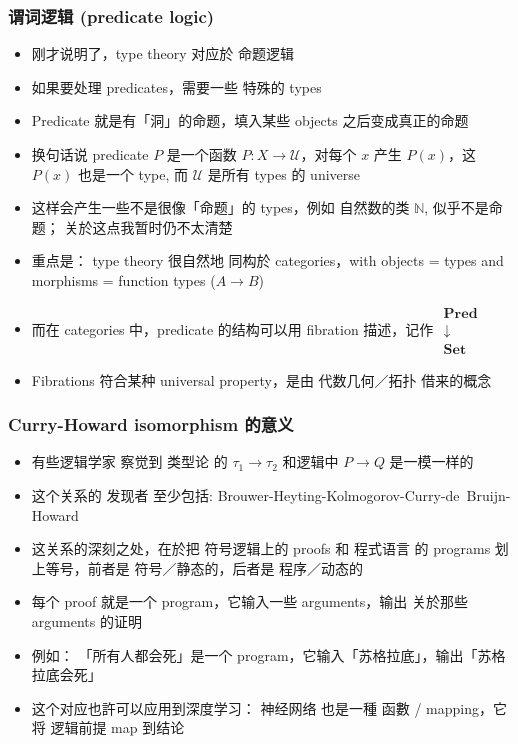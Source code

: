 \documentclass[16pt]{beamer}
\newcommand{\emp}[1]{{\color{violet}#1}}
\begin{document}
\begin{frame}
\frametitle{谓词逻辑 (predicate logic)}
\begin{itemize}
	\item 刚才说明了，type theory 对应於 \emp{命题逻辑}
	
	\item 如果要处理 predicates，需要一些 特殊的 types
	
	\item Predicate 就是有「洞」的命题，填入某些 objects 之后变成真正的命题
	
	\item 换句话说 predicate $P$ 是一个函数 $P: X \rightarrow \mathcal{U}$，对每个 $x$ 产生 $P(x)$，这 $P(x)$ 也是一个 type, 而 $\mathcal{U}$ 是所有 types 的 universe

	\item 这样会产生一些不是很像「命题」的 types，例如 自然数的类 $\mathbb{N}$, 似乎不是命题； 关於这点我暂时仍不太清楚

	\item 重点是： type theory 很自然地 \emp{同构}於 categories，with objects = types and morphisms = function types ($A \rightarrow B$)
	
	\item 而在 categories 中，predicate 的结构可以用 \emp{fibration} 描述，记作
	$\mathrel{\substack{\mathbf{Pred}\\\downarrow\\\mathbf{Set}}}$
	
	\item Fibrations 符合某种 universal property，是由 代数几何／拓扑 借来的概念
\end{itemize}
\end{frame}

\begin{frame}
\frametitle{Curry-Howard isomorphism 的意义}
\begin{itemize}
	\item 有些逻辑学家 察觉到 类型论 的 $\tau_1 \rightarrow \tau_2$ 和逻辑中 $P \rightarrow Q$ 是一模一样的
	
	\item 这个关系的 发现者 至少包括:  Brouwer-Heyting-Kolmogorov-Curry-\mbox{de Bruijn}-Howard
	
	\item 这关系的深刻之处，在於把 符号逻辑上的 proofs 和 程式语言 的 programs 划上等号，前者是 符号／静态的，后者是 程序／动态的
	
	\item 每个 proof 就是一个 program，它输入一些 arguments，输出 关於那些 arguments 的证明
	
	\item 例如： 「所有人都会死」是一个 program，它输入「苏格拉底」，输出「苏格拉底会死」 
	
	\item 这个对应也許可以应用到深度学习： 神经网络 也是一種 函數 / mapping，它将 逻辑前提 map 到结论
\end{itemize}
\end{frame}
\end{document}
